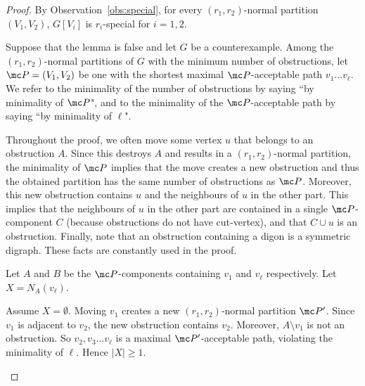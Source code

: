 \begin{proof}
By Observation~\ref{obs:special}, for every $(r_1,r_2)$-normal partition $(V_1, V_2)$, $G[V_i]$ is $r_i$-special for $i=1, 2$. 

Suppose that the lemma is false and let $G$ be a counterexample.  Among the $(r_1, r_2)$-normal partitions of $G$ with the minimum number of obstructions, let $\mc P = (V_1, V_2)$ be one with the shortest maximal $\mc P$-acceptable path $v_{1}\dots v_{\ell}$. 
We refer to the minimality of the number of obstructions by saying ``by minimality of $\mc P$", and to the minimality of the $\mc P$-acceptable path by saying ``by minimality of $\ell$". 


Throughout the proof, we often move some vertex $u$ that belongs to an  obstruction $A$. 
Since this destroys $A$ and results in a $(r_1,r_2)$-normal partition, the minimality of $\mc P$  implies that the move creates a new obstruction and thus the obtained partition has the same number of obstructions as $\mc P$. 
Moreover, this new obstruction  contains $u$  and  the neighbours of $u$ in the other part. This implies that the neighbours of $u$ in the other part are contained in a single $\mc P$-component $C$ (because obstructions do not have cut-vertex),   and that $C \cup u$ is an obstruction. Finally, note that an obstruction containing a digon is a symmetric digraph. 
These facts are constantly used in the proof. 

Let $A$ and $B$ be the $\mc P$-components containing $v_{1}$ and $v_{\ell}$ respectively. 
Let $X=N_{A}(v_{\ell})$. 
\medskip 

Assume  $X= \emptyset$. 
Moving $v_{1}$ creates a new $(r_1, r_2)$-normal partition $\mc P'$. Since $v_{1}$ is adjacent to $v_{2}$, the new obstruction contains $v_{2}$. Moreover, $A \setminus v_{1}$ is not an obstruction. So $v_{2}, v_{3} \dots v_{\ell}$ is a maximal $\mc P'$-acceptable path, violating the minimality of $\ell$. Hence $|X| \geq 1$.
\medskip 

\begin{figure}[ht]
    \centering
\end{figure}
\end{proof}
